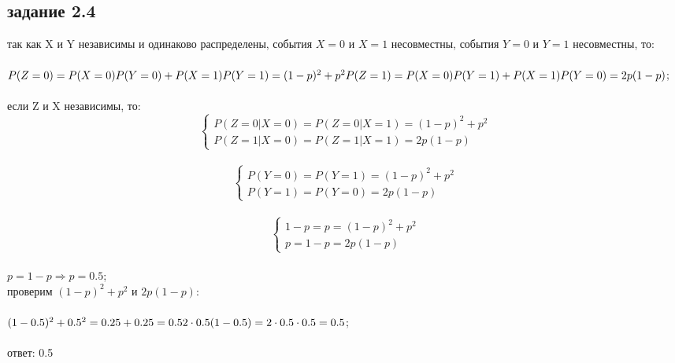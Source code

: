 \documentclass[a4paper]{article}
\begin{document}
\begin{large}
	\section*{задание 2.4}
	так как X и Y независимы и одинаково распределены, события $X=0$ и $X=1$ несовместны, события $Y=0$ и $Y=1$ несовместны, то:\\\\
	$
	P(Z=0)=P(X=0)P(Y=0)+P(X=1)P(Y=1)=(1-p)^2+p^2\\\\
	P(Z=1)=P(X=0)P(Y=1)+P(X=1)P(Y=0)=2p(1-p)
	$;\\\\
	если Z и X независимы, то:\\
	\[
		\left\{ \begin{array}{ll}
		P(Z=0|X=0)=P(Z=0|X=1)=(1-p)^2+p^2\\
		P(Z=1|X=0)=P(Z=1|X=1)=2p(1-p)
		\end{array} \right.
	\]\\
	\[
		\left\{ \begin{array}{ll}
			P(Y=0)=P(Y=1)=(1-p)^2+p^2\\
			P(Y=1)=P(Y=0)=2p(1-p)
		\end{array} \right.
	\]\\
	\[
	\left\{ \begin{array}{ll}
		1-p=p=(1-p)^2+p^2\\
		p=1-p=2p(1-p)
	\end{array} \right.
	\]\\
	$p=1-p\Rightarrow p=0.5$;\\
	проверим $(1-p)^2+p^2$ и $2p(1-p)$:\\\\
	$
	(1-0.5)^2+0.5^2=0.25+0.25=0.5\\\\
	2\cdot 0.5(1-0.5)=2\cdot 0.5\cdot 0.5=0.5
	$;\\\\
	ответ: 0.5

\end{large}
\end{document}
